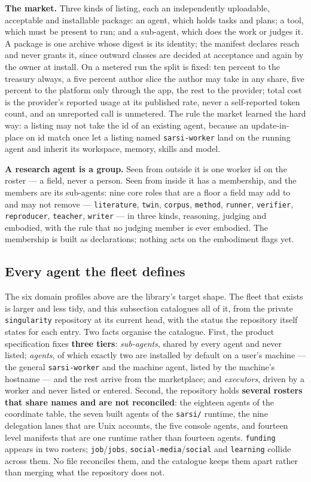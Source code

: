 \documentclass[11pt]{article}
\theoremstyle{definition}
\begin{document}
\textbf{The market.} Three kinds of listing, each an independently uploadable, acceptable and installable package: an agent, which holds tasks and plans; a tool, which must be present to run; and a sub-agent, which does the work or judges it. A package is one archive whose digest is its identity; the manifest declares reach and never grants it, since outward classes are decided at acceptance and again by the owner at install. On a metered run the split is fixed: ten percent to the treasury always, a five percent author slice the author may take in any share, five percent to the platform only through the app, the rest to the provider; total cost is the provider's reported usage at its published rate, never a self-reported token count, and an unreported call is unmetered. The rule the market learned the hard way: a listing may not take the id of an existing agent, because an update-in-place on id match once let a listing named \texttt{sarsi-worker} land on the running agent and inherit its workspace, memory, skills and model.

\textbf{A research agent is a group.} Seen from outside it is one worker id on the roster --- a field, never a person. Seen from inside it has a membership, and the members are its sub-agents: nine core roles that are a floor a field may add to and may not remove --- \texttt{literature}, \texttt{twin}, \texttt{corpus}, \texttt{method}, \texttt{runner}, \texttt{verifier}, \texttt{reproducer}, \texttt{teacher}, \texttt{writer} --- in three kinds, reasoning, judging and embodied, with the rule that no judging member is ever embodied. The membership is built as declarations; nothing acts on the embodiment flags yet.

\subsection{Every agent the fleet defines}\label{sec:everyagent}

The six domain profiles above are the library's target shape. The fleet that exists is larger and less tidy, and this subsection catalogues all of it, from the private \texttt{singularity} repository at its current head, with the status the repository itself states for each entry. Two facts organise the catalogue. First, the product specification fixes \textbf{three tiers}: \emph{sub-agents}, shared by every agent and never listed; \emph{agents}, of which exactly two are installed by default on a user's machine --- the general \texttt{sarsi-worker} and the machine agent, listed by the machine's hostname --- and the rest arrive from the marketplace; and \emph{executors}, driven by a worker and never listed or entered. Second, the repository holds \textbf{several rosters that share names and are not reconciled}: the eighteen agents of the coordinate table, the seven built agents of the \texttt{sarsi/} runtime, the nine delegation lanes that are Unix accounts, the five console agents, and fourteen level manifests that are one runtime rather than fourteen agents. \texttt{funding} appears in two rosters; \texttt{job}/\texttt{jobs}, \texttt{social-media}/\texttt{social} and \texttt{learning} collide across them. No file reconciles them, and the catalogue keeps them apart rather than merging what the repository does not.
\end{document}

